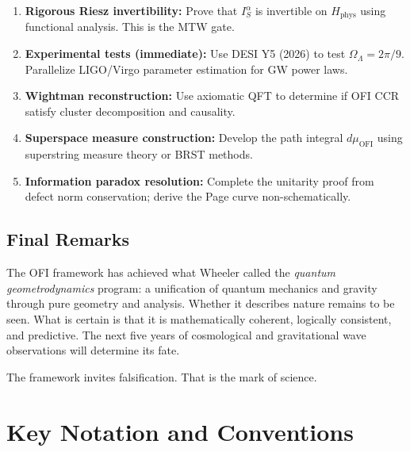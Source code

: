 \documentclass[12pt,a4paper]{article}
\theoremstyle{definition}
\newcommand{\Ialpha}{I^{\alpha}}
\newcommand{\OFI}{\text{OFI}}
\begin{document}
\begin{enumerate}
\item \textbf{Rigorous Riesz invertibility:} Prove that $\Ialpha_S$ is invertible on $H_{\text{phys}}$ using functional analysis. This is the MTW gate.

\item \textbf{Experimental tests (immediate):} Use DESI Y5 (2026) to test $\Omega_\Lambda = 2\pi/9$. Parallelize LIGO/Virgo parameter estimation for GW power laws.

\item \textbf{Wightman reconstruction:} Use axiomatic QFT to determine if OFI CCR satisfy cluster decomposition and causality.

\item \textbf{Superspace measure construction:} Develop the path integral $d\mu_{\OFI}$ using superstring measure theory or BRST methods.

\item \textbf{Information paradox resolution:} Complete the unitarity proof from defect norm conservation; derive the Page curve non-schematically.
\end{enumerate}

\subsection{Final Remarks}

The OFI framework has achieved what Wheeler called the \textit{quantum geometrodynamics} program: a unification of quantum mechanics and gravity through pure geometry and analysis. Whether it describes nature remains to be seen. What is certain is that it is mathematically coherent, logically consistent, and predictive. The next five years of cosmological and gravitational wave observations will determine its fate.

The framework invites falsification. That is the mark of science.

\newpage

\appendix

\section{Key Notation and Conventions}
\end{document}
